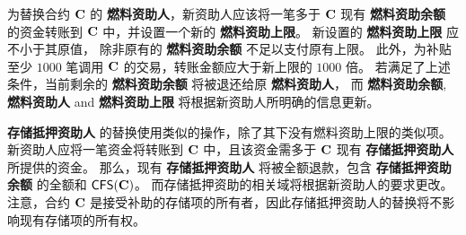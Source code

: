 为替换合约 $\mathbf{C}$ 的 \textbf{燃料资助人}，新资助人应该将一笔多于 $\mathbf{C}$ 现有 \textbf{燃料资助余额} 的资金转账到 $\mathbf{C}$ 中，并设置一个新的 \textbf{燃料资助上限}。
新设置的 \textbf{燃料资助上限} 应不小于其原值，
除非原有的 \textbf{燃料资助余额} 不足以支付原有上限。
此外，为补贴至少 $1000$ 笔调用 $\mathbf{C}$ 的交易，转账金额应大于新上限的 $1000$ 倍。
若满足了上述条件，当前剩余的 \textbf{燃料资助余额} 将被退还给原 \textbf{燃料资助人}，
而 \textbf{燃料资助余额}, \textbf{燃料资助人} and \textbf{燃料资助上限} 将根据新资助人所明确的信息更新。


\textbf{存储抵押资助人} 的替换使用类似的操作，除了其下没有燃料资助上限的类似项。
新资助人应将一笔资金将转账到 $\mathbf{C}$ 中，且该资金需多于 $\mathbf{C}$ 现有 \textbf{存储抵押资助人} 所提供的资金。
那么，现有 \textbf{存储抵押资助人} 将被全额退款，包含 \textbf{存储抵押资助余额} 的全额和 $\mathsf{CFS}(\mathbf{C})$。
而存储抵押资助的相关域将根据新资助人的要求更改。
注意，合约 $\mathbf{C}$ 是接受补助的存储项的所有者，因此存储抵押资助人的替换将不影响现有存储项的所有权。

